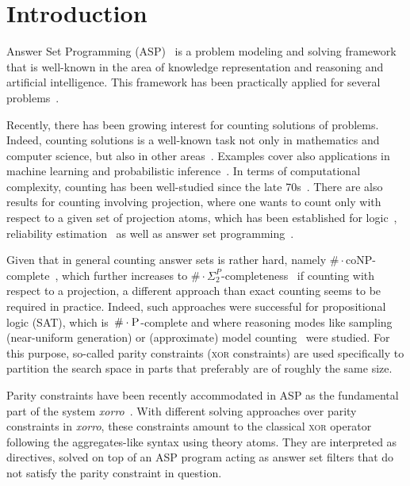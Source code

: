 \documentclass{article}
\renewcommand{\P}{\ensuremath{\textsc{P}}\xspace}
\newcommand{\cnt}[0]{\ensuremath{\#}}
\newcommand{\cntc}[0]{\ensuremath{\cnt\cdot}}
\newcommand{\XOR}{\textsc{xor}} %
\newcommand{\sysfont}{\textit}
\newcommand{\xorro}{\sysfont{xorro}}
\begin{document}
\section{Introduction} \label{sec:introduction}
%
Answer Set Programming (ASP)~\cite{Lifschitz99,BrewkaEiterTruszczynski11,GebserKaminskiKaufmannSchaub12} is a
problem modeling and solving framework that is well-known in the area
of knowledge representation and reasoning and artificial intelligence.
%
This framework has been practically applied for several
problems~\cite{BalducciniGelfondNogueira06a,NiemelaSimonsSoininen99,NogueiraBalducciniGelfond01a,GuziolowskiEtAl13a,SchaubWoltran18}.
%

Recently, there has been growing interest for counting solutions of problems.
%
Indeed, counting solutions is a well-known task not only in mathematics and computer
science, but also in other
areas~\cite{ChakrabortyMeelVardi16a,DomshlakHoffmann07a,GomesKautzSabharwalSelman08a,SangBeameKautz05a}.
%
%
%
Examples cover also applications in machine learning and probabilistic inference~\cite{ChaviraDarwiche08a}.
%
%
In terms of computational complexity, counting has been well-studied since the
late
70s~\cite{DurandHermannKolaitis05,HemaspaandraVollmer95a,Valiant79,Valiant79b}.
%
There are also results for counting involving projection, where one wants to
count only with respect to a given set of projection atoms,
which has been established for logic~\cite{AzizChuMuise15a,CapelliMengel19,FichteEtAl18,LagniezMarquis19a,GuptaSharmaRoy19a,SharmaRoySoos19a},
reliability estimation~\cite{MeelEtAl17a} as well as
answer set programming~\cite{GebserKaufmannSchaub09a,Aziz15a,FichteHecher19}.
%

Given that in general counting answer sets is rather hard, namely ${\#\cdot\text{coNP}}$-complete~\cite{FichteEtAl17,DurandHermannKolaitis05}, which further increases
to ${\#\cdot\Sigma_2^P}$-completeness~\cite{FichteHecher19} if counting with respect to a projection,
a different approach than exact counting seems to be required in practice.
%
Indeed, such approaches were successful for propositional logic (SAT), which is~$\cntc\P$-complete and where reasoning modes like sampling (near-uniform generation)
or (approximate) model counting~\cite{gosase07a,chmeva13a,ChakrabortyMV13,SharmaRoySoos19a}
were studied.
%
For this purpose, so-called parity constraints  (\XOR{} constraints) are used specifically to partition the search space in parts that preferably are of roughly the same size.

Parity constraints have been recently accommodated in ASP
as the fundamental part of the system \xorro{}~\cite{DBLP:conf/lpnmr/EverardoJKS19}.
%
With different solving approaches over parity constraints in \xorro{}, these constraints amount to the classical \XOR{} operator following the aggregates-like syntax using theory atoms.
They are interpreted as directives, solved on top of an ASP program acting as answer set filters that do not satisfy the parity constraint in question.
%
\end{document}

